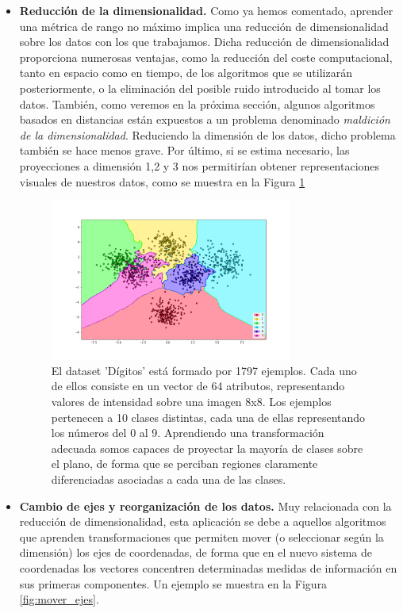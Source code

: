 \begin{itemize}
    \item \textbf{Reducción de la dimensionalidad.} Como ya hemos comentado, aprender una métrica de rango no máximo implica una reducción de dimensionalidad sobre los datos con los que trabajamos. Dicha reducción de dimensionalidad proporciona numerosas ventajas, como la reducción del coste computacional, tanto en espacio como en tiempo, de los algoritmos que se utilizarán posteriormente, o la eliminación del posible ruido introducido al tomar los datos. También, como veremos en la próxima sección, algunos algoritmos basados en distancias están expuestos a un problema denominado \emph{maldición de la dimensionalidad}. Reduciendo la dimensión de los datos, dicho problema también se hace menos grave. Por último, si se estima necesario, las proyecciones a dimensión 1,2 y 3 nos permitirían obtener representaciones visuales de nuestros datos, como se muestra en la Figura \ref{fig:reduc_dim}

    \begin{figure}[h]
    \centering
    \includegraphics[width=0.75\textwidth]{./images/ex_red_dim.png}
    \caption{El dataset 'Dígitos' está formado por 1797 ejemplos. Cada uno de ellos consiste en un vector de 64 atributos, representando valores de intensidad sobre una imagen 8x8. Los ejemplos pertenecen a 10 clases distintas, cada una de ellas representando los números del 0 al 9. Aprendiendo una transformación adecuada somos capaces de proyectar la mayoría de clases sobre el plano, de forma que se perciban regiones claramente diferenciadas asociadas a cada una de las clases.} \label{fig:reduc_dim}
    \end{figure}


    \item \textbf{Cambio de ejes y reorganización de los datos.} Muy relacionada con la reducción de dimensionalidad, esta aplicación se debe a aquellos algoritmos que aprenden transformaciones que permiten mover (o seleccionar según la dimensión) los ejes de coordenadas, de forma que en el nuevo sistema de coordenadas los vectores concentren determinadas medidas de información en sus primeras componentes. Un ejemplo se muestra en la Figura \ref{fig:mover_ejes}.


\end{itemize}
